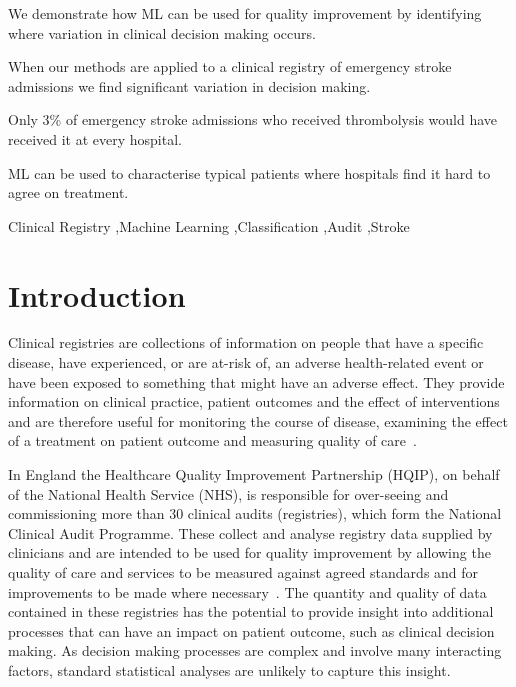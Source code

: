 \documentclass[12pt,a4paper, pdftex]{elsarticle}
\begin{document}
\begin{frontmatter}
\begin{highlights}
\item We demonstrate how ML can be used for quality improvement by identifying where variation in clinical decision making occurs.
\item When our methods are applied to a clinical registry of emergency stroke admissions we find significant variation in decision making.
\item Only 3\% of emergency stroke admissions who received thrombolysis would have received it at every hospital.
\item ML can be used to characterise typical patients where hospitals find it hard to agree on treatment.
\end{highlights}

\begin{keyword}

Clinical Registry \sep Machine Learning \sep Classification \sep Audit \sep Stroke

\end{keyword}

\end{frontmatter}



\section{Introduction}

Clinical registries are collections of information on people that have a specific disease, have experienced, or are at-risk of, an adverse health-related event or have been exposed to something that might have an adverse effect. They provide information on clinical practice, patient outcomes and the effect of interventions and are therefore useful for monitoring the course of disease, examining the effect of a treatment on patient outcome and measuring quality of care~\cite{gliklich2014registries}. 

In England the Healthcare Quality Improvement Partnership (HQIP), on behalf of the National Health Service (NHS), is responsible for over-seeing and commissioning more than 30 clinical audits (registries), which form the National Clinical Audit Programme. These collect and analyse registry data supplied by clinicians and are intended to be used for quality improvement by allowing the quality of care and services to be measured against agreed standards and for improvements to be made where necessary~\cite{burgess2011new}. The quantity and quality of data contained in these registries has the potential to provide insight into additional processes that can have an impact on patient outcome, such as clinical decision making. As decision making processes are complex and involve many interacting factors, standard statistical analyses are unlikely to capture this insight.  
\end{document}
